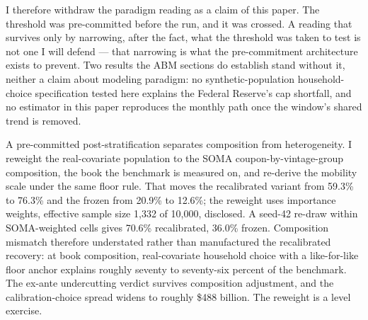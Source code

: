 I therefore withdraw the paradigm reading as a claim of this paper. The threshold was pre-committed before the run, and it was crossed. A reading that survives only by narrowing, after the fact, what the threshold was taken to test is not one I will defend --- that narrowing is what the pre-commitment architecture exists to prevent. Two results the ABM sections do establish stand without it, neither a claim about modeling paradigm: no synthetic-population household-choice specification tested here explains the Federal Reserve's cap shortfall, and no estimator in this paper reproduces the monthly path once the window's shared trend is removed.

A pre-committed post-stratification separates composition from heterogeneity. I reweight the real-covariate population to the SOMA coupon-by-vintage-group composition, the book the benchmark is measured on, and re-derive the mobility scale under the same floor rule. That moves the recalibrated variant from 59.3\% to 76.3\% and the frozen from 20.9\% to 12.6\%; the reweight uses importance weights, effective sample size 1{,}332 of 10{,}000, disclosed. A seed-42 re-draw within SOMA-weighted cells gives 70.6\% recalibrated, 36.0\% frozen. Composition mismatch therefore understated rather than manufactured the recalibrated recovery: at book composition, real-covariate household choice with a like-for-like floor anchor explains roughly seventy to seventy-six percent of the benchmark. The ex-ante undercutting verdict survives composition adjustment, and the calibration-choice spread widens to roughly \$488 billion. The reweight is a level exercise.

